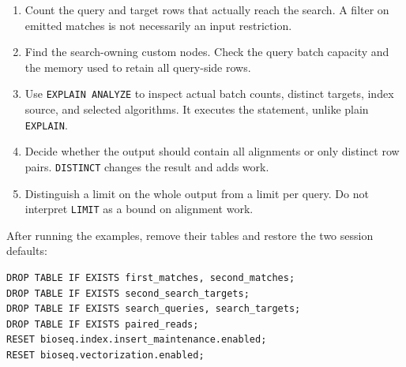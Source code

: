 \begin{enumerate}
  \item Count the query and target rows that actually reach the search.
    A filter on emitted matches is not necessarily an input restriction.
  \item Find the search-owning custom nodes. Check the query batch
    capacity and the memory used to retain all query-side rows.
  \item Use \texttt{EXPLAIN ANALYZE} to inspect actual batch counts,
    distinct targets, index source, and selected algorithms. It executes
    the statement, unlike plain \texttt{EXPLAIN}.
  \item Decide whether the output should contain all alignments or only
    distinct row pairs. \texttt{DISTINCT} changes the result and adds work.
  \item Distinguish a limit on the whole output from a limit per query.
    Do not interpret \texttt{LIMIT} as a bound on alignment work.
\end{enumerate}

After running the examples, remove their tables and restore the two session
defaults:

\par\noindent\begin{minipage}{\linewidth}
\begin{lstlisting}[style=bioseq-appendix-sql]
DROP TABLE IF EXISTS first_matches, second_matches;
DROP TABLE IF EXISTS second_search_targets;
DROP TABLE IF EXISTS search_queries, search_targets;
DROP TABLE IF EXISTS paired_reads;
RESET bioseq.index.insert_maintenance.enabled;
RESET bioseq.vectorization.enabled;
\end{lstlisting}
\end{minipage}
